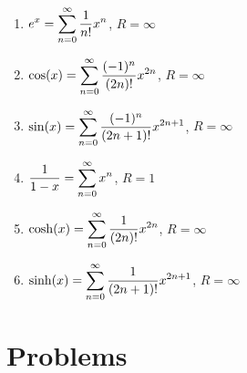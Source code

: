 \begin{enumerate}
	\item $\displaystyle e^x = \sum_{n=0}^\infty \frac{1}{n!}x^n$, $R=\infty$
	\item $\displaystyle \cos(x) = \sum_{n=0}^\infty \frac{(-1)^n}{(2n)!}x^{2n}$, $R=\infty$
	\item $\displaystyle \sin(x) = \sum_{n=0}^\infty \frac{(-1)^n}{(2n+1)!}x^{2n+1}$, $R=\infty$
	\item $\displaystyle \frac{1}{1-x} = \sum_{n=0}^\infty x^n$, $R=1$
	\item $\displaystyle \cosh(x) = \sum_{n=0}^\infty \frac{1}{(2n)!}x^{2n}$, $R=\infty$
	\item $\displaystyle \sinh(x) = \sum_{n=0}^\infty \frac{1}{(2n+1)!}x^{2n+1}$, $R=\infty$
\end{enumerate}

\section{Problems}

